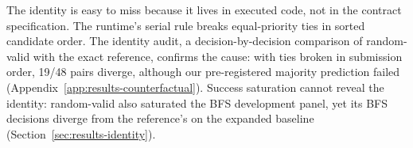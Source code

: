 The identity is easy to miss because it lives in executed code, not in the contract specification.
The runtime's serial rule breaks equal-priority ties in sorted candidate order.
The identity audit, a decision-by-decision comparison of random-valid with the exact reference, confirms the cause: with ties broken in submission order, 19/48 pairs diverge, although our pre-registered majority prediction failed (Appendix~\ref{app:results-counterfactual}).
Success saturation cannot reveal the identity: random-valid also saturated the BFS development panel, yet its BFS decisions diverge from the reference's on the expanded baseline (Section~\ref{sec:results-identity}).

